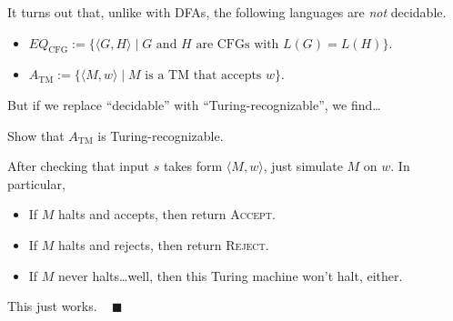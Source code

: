 It turns out that, unlike with DFAs, the following languages
are \emph{not} decidable.
\begin{itemize}
    \item $EQ_{\mathrm{CFG}} := \{\langle G, H \rangle \mid
    G \text{ and } H \text{ are CFGs with }
    L(G) = L(H)\}$.
    \item $A_{\mathrm{TM}} := \{\langle M, w \rangle \mid
    M \text{ is a TM that accepts } w\}$.
\end{itemize}
But if we replace ``decidable'' with ``Turing-recognizable'',
we find\dots

\begin{problem}
    Show that $A_{\mathrm{TM}}$ is Turing-recognizable.
\end{problem}

\begin{solution}
    After checking that input $s$ takes form $\langle M, w \rangle$,
    just simulate $M$ on $w$.  In particular,
    \begin{itemize}
        \item If $M$ halts and accepts, then return \textsc{Accept}.
        \item If $M$ halts and rejects, then return \textsc{Reject}.
        \item If $M$ never halts\dots well, then
        this Turing machine won't halt, either.
    \end{itemize}
    This just works. ~ $\blacksquare$
\end{solution}

